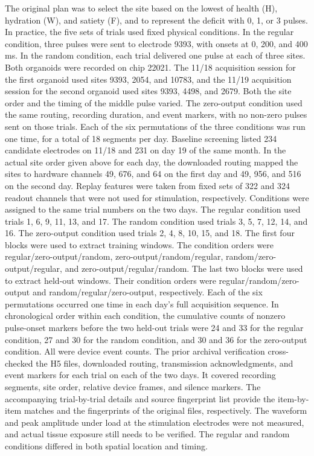 \documentclass{article}
\begin{document}
The original plan was to select the site based on the lowest of health (H), hydration (W), and satiety (F), and to represent the deficit with 0, 1, or 3 pulses. In practice, the five sets of trials used fixed physical conditions. In the regular condition, three pulses were sent to electrode 9393, with onsets at 0, 200, and 400 ms. In the random condition, each trial delivered one pulse at each of three sites. Both organoids were recorded on chip 22021. The 11/18 acquisition session for the first organoid used sites 9393, 2054, and 10783, and the 11/19 acquisition session for the second organoid used sites 9393, 4498, and 2679. Both the site order and the timing of the middle pulse varied. The zero-output condition used the same routing, recording duration, and event markers, with no non-zero pulses sent on those trials. Each of the six permutations of the three conditions was run one time, for a total of 18 segments per day. Baseline screening listed 234 candidate electrodes on 11/18 and 231 on day 19 of the same month. In the actual site order given above for each day, the downloaded routing mapped the sites to hardware channels 49, 676, and 64 on the first day and 49, 956, and 516 on the second day. Replay features were taken from fixed sets of 322 and 324 readout channels that were not used for stimulation, respectively. Conditions were assigned to the same trial numbers on the two days. The regular condition used trials 1, 6, 9, 11, 13, and 17. The random condition used trials 3, 5, 7, 12, 14, and 16. The zero-output condition used trials 2, 4, 8, 10, 15, and 18. The first four blocks were used to extract training windows. The condition orders were regular/zero-output/random, zero-output/random/regular, random/zero-output/regular, and zero-output/regular/random. The last two blocks were used to extract held-out windows. Their condition orders were regular/random/zero-output and random/regular/zero-output, respectively. Each of the six permutations occurred one time in each day’s full acquisition sequence. In chronological order within each condition, the cumulative counts of nonzero pulse-onset markers before the two held-out trials were 24 and 33 for the regular condition, 27 and 30 for the random condition, and 30 and 36 for the zero-output condition. All were device event counts. The prior archival verification cross-checked the H5 files, downloaded routing, transmission acknowledgments, and event markers for each trial on each of the two days. It covered recording segments, site order, relative device frames, and silence markers. The accompanying trial-by-trial details and source fingerprint list provide the item-by-item matches and the fingerprints of the original files, respectively. The waveform and peak amplitude under load at the stimulation electrodes were not measured, and actual tissue exposure still needs to be verified. The regular and random conditions differed in both spatial location and timing.
\end{document}
